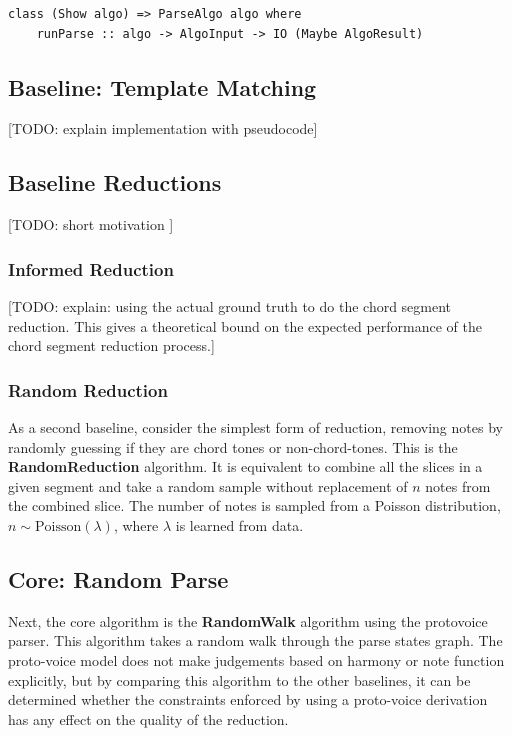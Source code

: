 \documentclass[12pt,a4paper,twoside,openany]{report} \usepackage[pdfborder={0 0 0}]{hyperref}    %
\theoremstyle{definition} \newtheorem{definition}{Definition}[section]
\begin{document}
\begin{lstlisting}[caption={Algorithm type-class}, captionpos=b] 
  class (Show algo) => ParseAlgo algo where 
    runParse :: algo -> AlgoInput -> IO (Maybe AlgoResult) 
\end{lstlisting}


\subsection{Baseline: Template Matching}
[TODO: explain implementation with pseudocode]

\subsection{Baseline Reductions}
[TODO: short motivation ]

\subsubsection{Informed Reduction}
[TODO: explain: using the actual ground truth to do the chord segment reduction. 
This gives a theoretical bound on the expected performance of the chord segment reduction process.]

\subsubsection{Random Reduction}
As a second baseline, consider the simplest form of reduction, removing notes by randomly guessing if they are chord
tones or non-chord-tones. This is the \textbf{RandomReduction} algorithm. It is equivalent to combine all the slices in
a given segment and take a random sample without replacement of $n$ notes from the combined slice. The number of notes
is sampled from a Poisson distribution, $n \sim \text{Poisson}(\lambda)$, where $\lambda$ is learned from data. 

\subsection{Core: Random Parse}
Next, the core algorithm is the \textbf{RandomWalk} algorithm using the protovoice parser. This algorithm takes a random
walk through the parse states graph. The proto-voice model does not make judgements based on harmony or note function
explicitly, but by comparing this algorithm to the other baselines, it can be determined whether the constraints
enforced by using a proto-voice derivation has any effect on the quality of the reduction. 
\end{document}
